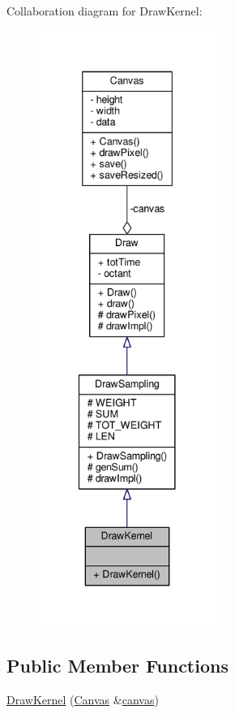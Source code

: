Collaboration diagram for Draw\+Kernel\+:\nopagebreak
\begin{figure}[H]
\begin{center}
\leavevmode
\includegraphics[height=550pt]{classDrawKernel__coll__graph}
\end{center}
\end{figure}
\subsection*{Public Member Functions}
\begin{DoxyCompactItemize}
\item 
\hyperlink{classDrawKernel_a5f419bac95daf351c15a12517df229a6}{Draw\+Kernel} (\hyperlink{classCanvas}{Canvas} \&\hyperlink{classDraw_a72ed77716d9eb7068414f0e4e00753bd}{canvas})
\end{DoxyCompactItemize}
